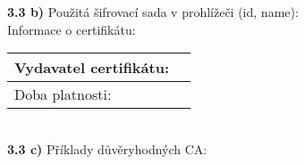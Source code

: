\documentclass[a4paper,11pt]{article}
\begin{document}
\textbf{3.3 b)} Použitá šifrovací sada v prohlížeči (id, name): \underline{\hspace{7cm}} \\ 

Informace o certifikátu:\\

\renewcommand\arraystretch{1.3}
\begin{tabular}{|l|r|}
\hline
Vydavatel certifikátu: & \hspace{30em} \\ \hline
Doba platnosti: & \\ \hline
\end{tabular}
\renewcommand\arraystretch{1}
\vspace{0.5cm}\\

{\bf 3.3 c)} Příklady důvěryhodných CA:\\


\end{document}
